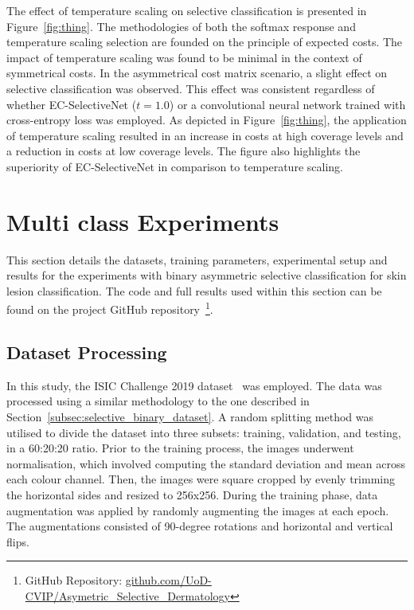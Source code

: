 The effect of temperature scaling on selective classification is presented in Figure~\ref{fig:thing}. The methodologies of both the softmax response and temperature scaling selection are founded on the principle of expected costs. The impact of temperature scaling was found to be minimal in the context of symmetrical costs. In the asymmetrical cost matrix scenario, a slight effect on selective classification was observed. This effect was consistent regardless of whether EC-SelectiveNet ($t=1.0$) or a convolutional neural network trained with cross-entropy loss was employed. As depicted in Figure~\ref{fig:thing}, the application of temperature scaling resulted in an increase in costs at high coverage levels and a reduction in costs at low coverage levels. The figure also highlights the superiority of EC-SelectiveNet in comparison to temperature scaling.



\section{Multi class Experiments}
\label{sec:selective_multi_class_experiments}
This section details the datasets, training parameters, experimental setup and results for the experiments with binary asymmetric selective classification for skin lesion classification. The code and full results used within this section can be found on the project GitHub repository~\footnote{GitHub Repository: \url{github.com/UoD-CVIP/Asymetric_Selective_Dermatology}}.

\subsection{Dataset Processing}
In this study, the ISIC Challenge 2019 dataset~\citep{codella2018skin,combalia2019bcn20000,tschandl2018ham10000} was employed. The data was processed using a similar methodology to the one described in Section~\ref{subsec:selective_binary_dataset}. A random splitting method was utilised to divide the dataset into three subsets: training, validation, and testing, in a 60:20:20 ratio. Prior to the training process, the images underwent normalisation, which involved computing the standard deviation and mean across each colour channel. Then, the images were square cropped by evenly trimming the horizontal sides and resized to 256x256. During the training phase, data augmentation was applied by randomly augmenting the images at each epoch. The augmentations consisted of 90-degree rotations and horizontal and vertical flips.

